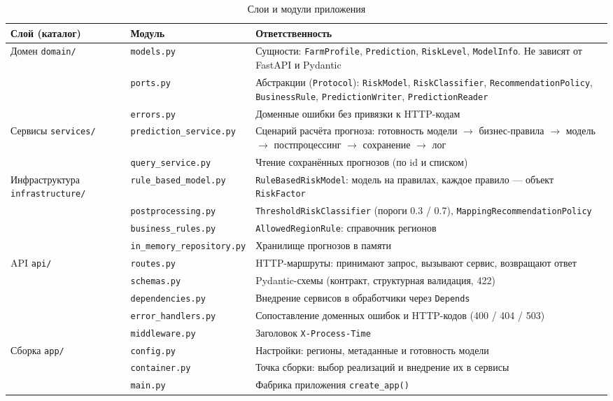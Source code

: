 \documentclass[12pt,a4paper]{article}
\begin{document}
\begin{table}[H]
\centering
\caption{Слои и модули приложения}
\small
\setlength{\tabcolsep}{4pt}
\begin{tabular}{|L{3.3cm}|L{5.0cm}|L{7.3cm}|}
\hline
\textbf{Слой (каталог)} & \textbf{Модуль} & \textbf{Ответственность} \\
\hline
Домен \newline \texttt{domain/} & \texttt{models.py} & Сущности: \texttt{FarmProfile}, \texttt{Prediction}, \texttt{RiskLevel}, \texttt{ModelInfo}. Не зависят от FastAPI и Pydantic \\
 & \texttt{ports.py} & Абстракции (\texttt{Protocol}): \texttt{RiskModel}, \texttt{RiskClassifier}, \texttt{RecommendationPolicy}, \texttt{BusinessRule}, \texttt{PredictionWriter}, \texttt{PredictionReader} \\
 & \texttt{errors.py} & Доменные ошибки без привязки к HTTP-кодам \\
\hline
Сервисы \newline \texttt{services/} & \texttt{prediction\_service.py} & Сценарий расчёта прогноза: готовность модели $\to$ бизнес-правила $\to$ модель $\to$ постпроцессинг $\to$ сохранение $\to$ лог \\
 & \texttt{query\_service.py} & Чтение сохранённых прогнозов (по id и списком) \\
\hline
Инфраструктура \newline \texttt{infrastructure/} & \texttt{rule\_based\_model.py} & \texttt{RuleBasedRiskModel}: модель на правилах, каждое правило --- объект \texttt{RiskFactor} \\
 & \texttt{postprocessing.py} & \texttt{ThresholdRiskClassifier} (пороги 0.3 / 0.7), \texttt{MappingRecommendationPolicy} \\
 & \texttt{business\_rules.py} & \texttt{AllowedRegionRule}: справочник регионов \\
 & \texttt{in\_memory\_repository.py} & Хранилище прогнозов в памяти \\
\hline
API \newline \texttt{api/} & \texttt{routes.py} & HTTP-маршруты: принимают запрос, вызывают сервис, возвращают ответ \\
 & \texttt{schemas.py} & Pydantic-схемы (контракт, структурная валидация, 422) \\
 & \texttt{dependencies.py} & Внедрение сервисов в обработчики через \texttt{Depends} \\
 & \texttt{error\_handlers.py} & Сопоставление доменных ошибок и HTTP-кодов (400 / 404 / 503) \\
 & \texttt{middleware.py} & Заголовок \texttt{X-Process-Time} \\
\hline
Сборка \newline \texttt{app/} & \texttt{config.py} & Настройки: регионы, метаданные и готовность модели \\
 & \texttt{container.py} & Точка сборки: выбор реализаций и внедрение их в сервисы \\
 & \texttt{main.py} & Фабрика приложения \texttt{create\_app()} \\
\hline
\end{tabular}
\end{table}
\end{document}
